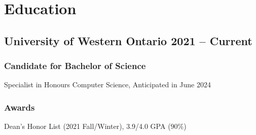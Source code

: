\documentclass[9pt]{article}
\begin{document}
\section{Education}
\subsection{University of Western Ontario \hfill \normalsize\textnormal{2021 -- Current}}
\subsubsection{Candidate for Bachelor of Science} Specialist in Honours Computer Science, Anticipated in June 2024

\subsubsection{Awards} Dean's Honor List (2021 Fall/Winter), 3.9/4.0 GPA (90\%)
\end{document}
